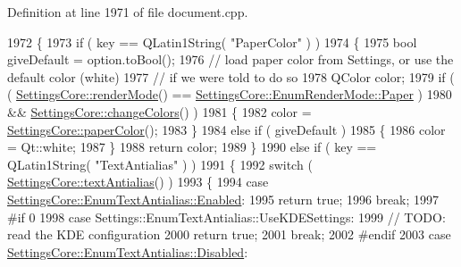 Definition at line 1971 of file document.\+cpp.


\begin{DoxyCode}
1972 \{
1973     \textcolor{keywordflow}{if} ( key == QLatin1String( \textcolor{stringliteral}{"PaperColor"} ) )
1974     \{
1975         \textcolor{keywordtype}{bool} giveDefault = option.toBool();
1976         \textcolor{comment}{// load paper color from Settings, or use the default color (white)}
1977         \textcolor{comment}{// if we were told to do so}
1978         QColor color;
1979         \textcolor{keywordflow}{if} ( ( \hyperlink{classOkular_1_1SettingsCore_a6fcb9ee5ad7a92b49ad31344771cca2d}{SettingsCore::renderMode}() == 
      \hyperlink{classOkular_1_1SettingsCore_1_1EnumRenderMode_aae172bdb345dda4d639e763709ea357aa58af23c7fbd8ea1998995a8eaffa125d}{SettingsCore::EnumRenderMode::Paper} )
1980              && \hyperlink{classOkular_1_1SettingsCore_af01449e331a4e973d5cb3879a3e76081}{SettingsCore::changeColors}() )
1981         \{
1982             color = \hyperlink{classOkular_1_1SettingsCore_ab59e5e75137763e3a97b545dcfd2bb30}{SettingsCore::paperColor}();
1983         \}
1984         \textcolor{keywordflow}{else} \textcolor{keywordflow}{if} ( giveDefault )
1985         \{
1986             color = Qt::white;
1987         \}
1988         \textcolor{keywordflow}{return} color;
1989     \}
1990     \textcolor{keywordflow}{else} \textcolor{keywordflow}{if} ( key == QLatin1String( \textcolor{stringliteral}{"TextAntialias"} ) )
1991     \{
1992         \textcolor{keywordflow}{switch} ( \hyperlink{classOkular_1_1SettingsCore_acfbe444f3d02896d1873772367a6debf}{SettingsCore::textAntialias}() )
1993         \{
1994             \textcolor{keywordflow}{case} \hyperlink{classOkular_1_1SettingsCore_1_1EnumTextAntialias_a7609fd32c2acd57b5d3ce4ac3b01a9e4ab833e0a93d6d598e69c7fc84b5a134a1}{SettingsCore::EnumTextAntialias::Enabled}:
1995                 \textcolor{keywordflow}{return} \textcolor{keyword}{true};
1996                 \textcolor{keywordflow}{break};
1997 \textcolor{preprocessor}{#if 0}
1998             \textcolor{keywordflow}{case} Settings::EnumTextAntialias::UseKDESettings:
1999                 \textcolor{comment}{// TODO: read the KDE configuration}
2000                 \textcolor{keywordflow}{return} \textcolor{keyword}{true};
2001                 \textcolor{keywordflow}{break};
2002 \textcolor{preprocessor}{#endif}
2003             \textcolor{keywordflow}{case} \hyperlink{classOkular_1_1SettingsCore_1_1EnumTextAntialias_a7609fd32c2acd57b5d3ce4ac3b01a9e4afd7c58c07865239fb469b1e0786810c2}{SettingsCore::EnumTextAntialias::Disabled}:

\end{DoxyCode}
